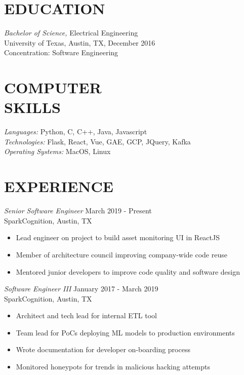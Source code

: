 \documentclass[margin,10pt]{res}
\begin{document}
\address{philliplemons512@gmail.com
      \\ www.philliplemons.com}

\begin{resume}

\section{EDUCATION} {\sl Bachelor of Science,} Electrical Engineering \\
                University of Texas, Austin, TX,
                December 2016 \\
                Concentration: Software Engineering

\section{COMPUTER \\ SKILLS} {\sl Languages:} Python, C, C++, Java,
                Javascript \\
                {\sl Technologies:} Flask, React, Vue, GAE, GCP, JQuery, Kafka \\
                {\sl Operating Systems:} MacOS, Linux

\section{EXPERIENCE}
    {\sl Senior Software Engineer } \hfill      March 2019 - Present \\
    SparkCognition, Austin, TX
    \begin{itemize} \itemsep -2pt %
        \item Lead engineer on project to build asset monitoring UI in ReactJS
        \item Member of architecture council improving company-wide code reuse
        \item Mentored junior developers to improve code quality and software design
    \end{itemize}

    {\sl Software Engineer III} \hfill         January 2017 - March 2019 \\
    SparkCognition, Austin, TX
    \begin{itemize} \itemsep -2pt %
        \item Architect and tech lead for internal ETL tool
        \item Team lead for PoCs deploying ML models to production environments
        \item Wrote documentation for developer on-boarding process
        \item Monitored honeypots for trends in malicious hacking attempts
    \end{itemize}


\end{resume}
\end{document}
